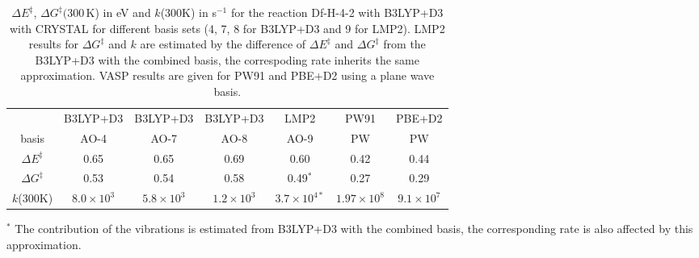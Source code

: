 \documentclass[11pt,DIV=13,BCOR=5mm,a4paper,headinclude]{scrbook}
\begin{document}
\begin{table}[!h]
  \centering
  \caption{$\Delta E^\ddagger$, $\Delta G^\ddagger(300\,$K) in eV and $k$(300K) in s$^{-1}$ for the reaction Df-H-4-2 with B3LYP+D3 with CRYSTAL for different basis sets (4, 7, 8 for B3LYP+D3 and 9 for LMP2).
  LMP2 results for $\Delta G^\ddagger$ and $k$ are estimated by the difference of $\Delta E^\ddagger$ and $\Delta G^\ddagger$ from the B3LYP+D3 with the combined basis, the correspoding rate inherits the same approximation.
  VASP results are given for PW91 and PBE+D2 using a plane wave basis.}
  \begin{tabular}{c|ccc|c|cc}%
  \toprule
    & B3LYP+D3 &B3LYP+D3 &B3LYP+D3&LMP2 &PW91&PBE+D2\\
    basis&AO-4&AO-7&AO-8&AO-9&PW&PW\\\midrule
   $\Delta E^\ddagger$ &0.65 &0.65 &0.69 & 0.60&0.42&0.44\\
   $\Delta G^\ddagger$ &0.53 &0.54 &0.58 & 0.49$^\ast$ &0.27&0.29\\
   $k$(300K) &$8.0\times 10^3$ &$5.8\times 10^3$ &$1.2\times 10^3$ & $3.7\times 10^{4\ast}$&$1.97\times 10^8$ &$9.1\times 10^7$\\\bottomrule 
  \end{tabular}
  \begin{tablenotes}
 \footnotesize
\item[] $^\ast$ The contribution of the vibrations is estimated from B3LYP+D3 with the combined basis, the corresponding rate is also affected by this approximation.
\end{tablenotes}
  \label{tab:k_crystal-reopt+noopt}
\end{table}
\\
\end{document}
